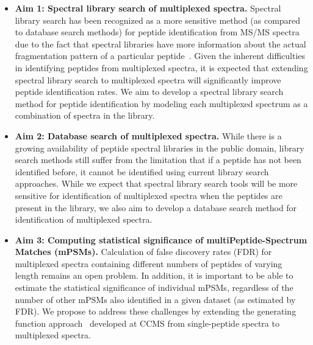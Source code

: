 \documentclass[arial,11pt]{article}
\begin{document}
\begin{itemize}
    \item {\bf Aim 1: Spectral library search of multiplexed spectra.} Spectral library search has been recognized as a more sensitive method (as compared to database search methods) for peptide identification from MS/MS spectra due to the fact that spectral libraries have more information about the actual fragmentation pattern of a particular peptide~\cite{zhangunderstanding}.  Given the inherent difficulties in identifying peptides from multiplexed spectra, it is expected that extending spectral library search to multiplexed spectra will significantly improve peptide identification rates.
        We aim to develop a spectral library search method for peptide identification by modeling each multiplexed spectrum as a combination of spectra in the library.

    \item {\bf Aim 2: Database search of multiplexed spectra.} While there is a growing availability of peptide spectral libraries in the public domain, library search methods still suffer from the limitation that if a peptide has not been identified before, it cannot be identified using current library search approaches. While we expect that spectral library search tools will be more sensitive for identification of multiplexed spectra when the peptides are present in the library, we also aim to develop a database search method for identification of multiplexed spectra. %

     \item {\bf Aim 3: Computing statistical significance of multiPeptide-Spectrum Matches (mPSMs).} Calculation of false discovery rates (FDR) for multiplexed spectra containing different numbers of peptides of varying length remains an open problem.  In addition, it is important to be able to estimate the statistical significance of individual mPSMs, regardless of the number of other mPSMs also identified in a given dataset (as estimated by FDR). We propose to address these challenges by extending the generating function approach~\cite{kim2008spectral} developed at CCMS from single-peptide spectra to multiplexed spectra.

\end{itemize}

\end{document}
